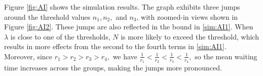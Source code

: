 \documentclass[pdflatex,sn-mathphys-ay]{sn-jnl}
\theoremstyle{thmstyleone}%
\theoremstyle{thmstyletwo}%
\theoremstyle{thmstylethree}%
\begin{document}
        \newpage

        
        
Figure \ref{fig:AI} shows the simulation results. The graph exhibits three jumps around the threshold values $n_1,n_2,$ and $n_3$, with zoomed-in views shown in Figure \ref{fig:AI2}. These jumps are also reflected in the bound in  \eqref{sim:AI1}. When $\lambda$ is close to one of the thresholds, $N$ is more likely to exceed the threshold, which results in more effects from the second to the fourth terms in \eqref{sim:AI1}. Moreover, since $r_1>r_2>r_3>r_4,$
we have $\frac{1}{r_1}<\frac{1}{r_2}<\frac{1}{r_3}<\frac{1}{r_4},$
so the mean waiting time increases across the groups, making the jumps more pronounced.
\end{document}

